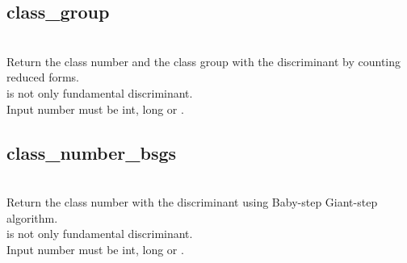   \subsection{class\_group}
   \\
   \spacing
   \quad Return the class number and the class group with the discriminant  by counting reduced forms. \\
   \spacing
   \quad {} is not only fundamental discriminant. \\
   \spacing
   \quad Input number  must be int, long or . 
%
  \subsection{class\_number\_bsgs}
   \\
   \spacing
   \quad Return the class number with the discriminant  using Baby-step Giant-step algorithm. \\
   \spacing
   \quad {} is not only fundamental discriminant. \\
   \spacing
   \quad Input number  must be int, long or . 
%
